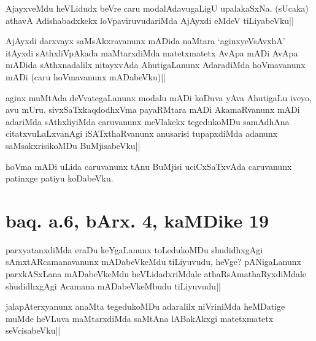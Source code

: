 \begin{artha}
AjayxveMdu heVLidudx beVre caru modalAdavugaLigU upalakaSxNa. (sUcaka) 
athavA Adishabadxkekx loVpaviruvudariMda AjAyxdi eMdeV tiLiyabeVku||
\end{artha}


\begin{artha}
AjAyxdi darxvayx saMsAkxravanunx mADida naMtara `aginxyeVsAvxhA' 
itAyxdi sAthxliVpAkada maMtarxdiMda matetxmatetx AvApa mADi AvApa 
mADida sAthxnadalilx nitayxvAda AhutigaLanunx AdaradiMda hoVmavanunx 
mADi (caru hoVmavanunx mADabeVku)||
\end{artha}


\begin{artha}
aginx muMtAda deVvategaLanunx modalu mADi koDuva yAva AhutigaLu iveyo, 
avu mUru. sivxSaTxkaqdodhxVma payaRMtara mADi AkamaRvanunx mADi 
adariMda sAthxliyiMda caruvanunx meVlakekx tegedukoMDu samAdhAna 
citatxvuLaLxvanAgi iSATxthaRvanunx anusarisi tupapxdiMda adanunx 
saMsakxrisikoMDu BuMjisabeVku||
\end{artha}


\begin{artha}
hoVma mADi uLida caruvanunx tAnu BuMjisi uciCxSaTxvAda caruvanunx 
patinxge patiyu koDabeVku.
\end{artha}

\section*{baq. a.6, bArx. 4, kaMDike 19}

\stext

\begin{artha}
parxyatanxdiMda eraDu keYgaLanunx toLedukoMDu shudidhxgAgi 
sAmxtARcamanavanunx mADabeVkeMdu tiLiyuvudu, heVge? pANigaLanunx 
parxkASxLana mADabeVkeMdu heVLidadxriMdale athaRsAmathaRyxdiMdale 
shudidhxgAgi Acamana mADabeVkeMbudu tiLiyuvudu|| 
\end{artha}


\begin{artha}
jalapAterxyanunx anaMta tegedukoMDu adaralilx niVriniMda heMDatige 
muMde heVLuva maMtarxdiMda saMtAna lABakAkxgi matetxmatetx 
seVcisabeVku||
\end{artha}

